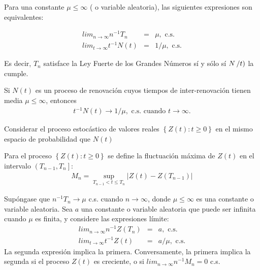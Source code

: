 \begin{Teo}
Para una constante $\mu\leq\infty$ ( o variable aleatoria), las siguientes expresiones son equivalentes:

\begin{eqnarray}
lim_{n\rightarrow\infty}n^{-1}T_{n}&=&\mu,\textrm{ c.s.}\\
lim_{t\rightarrow\infty}t^{-1}N\left(t\right)&=&1/\mu,\textrm{ c.s.}
\end{eqnarray}
\end{Teo}


Es decir, $T_{n}$ satisface la Ley Fuerte de los Grandes N\'umeros s\'i y s\'olo s\'i $N\left/t\right)$ la cumple.


\begin{Coro}
Si $N\left(t\right)$ es un proceso de renovaci\'on cuyos tiempos de inter-renovaci\'on tienen media $\mu\leq\infty$, entonces
\begin{eqnarray}
t^{-1}N\left(t\right)\rightarrow 1/\mu,\textrm{ c.s. cuando }t\rightarrow\infty.
\end{eqnarray}

\end{Coro}


Considerar el proceso estoc\'astico de valores reales $\left\{Z\left(t\right):t\geq0\right\}$ en el mismo espacio de probabilidad que $N\left(t\right)$

\begin{Def}
Para el proceso $\left\{Z\left(t\right):t\geq0\right\}$ se define la fluctuaci\'on m\'axima de $Z\left(t\right)$ en el intervalo $\left(T_{n-1},T_{n}\right]$:
\begin{eqnarray*}
M_{n}=\sup_{T_{n-1}<t\leq T_{n}}|Z\left(t\right)-Z\left(T_{n-1}\right)|
\end{eqnarray*}
\end{Def}

\begin{Teo}
Sup\'ongase que $n^{-1}T_{n}\rightarrow\mu$ c.s. cuando $n\rightarrow\infty$, donde $\mu\leq\infty$ es una constante o variable aleatoria. Sea $a$ una constante o variable aleatoria que puede ser infinita cuando $\mu$ es finita, y considere las expresiones l\'imite:
\begin{eqnarray}
lim_{n\rightarrow\infty}n^{-1}Z\left(T_{n}\right)&=&a,\textrm{ c.s.}\\
lim_{t\rightarrow\infty}t^{-1}Z\left(t\right)&=&a/\mu,\textrm{ c.s.}
\end{eqnarray}
La segunda expresi\'on implica la primera. Conversamente, la primera implica la segunda si el proceso $Z\left(t\right)$ es creciente, o si $lim_{n\rightarrow\infty}n^{-1}M_{n}=0$ c.s.
\end{Teo}

